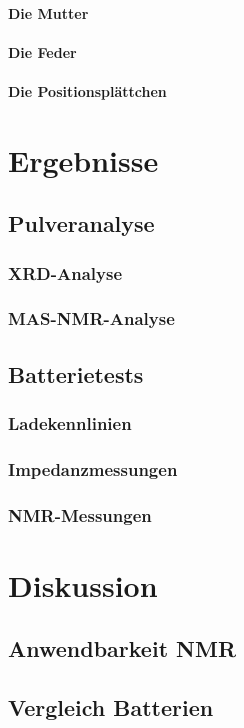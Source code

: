 \documentclass[a4paper, 11pt, headsepline,footsepline,twoside,abstract]{scrbook}
\begin{document}
\subsubsection{Die Mutter}
\subsubsection{Die Feder}
\subsubsection{Die Positionsplättchen}
\chapter{Ergebnisse}
\section{Pulveranalyse}
\subsection{XRD-Analyse}
\subsection{MAS-NMR-Analyse}
\section{Batterietests}
\subsection{Ladekennlinien}
\subsection{Impedanzmessungen}
\subsection{NMR-Messungen}
\chapter{Diskussion}
\section{Anwendbarkeit NMR}
\section{Vergleich Batterien}
\end{document}
